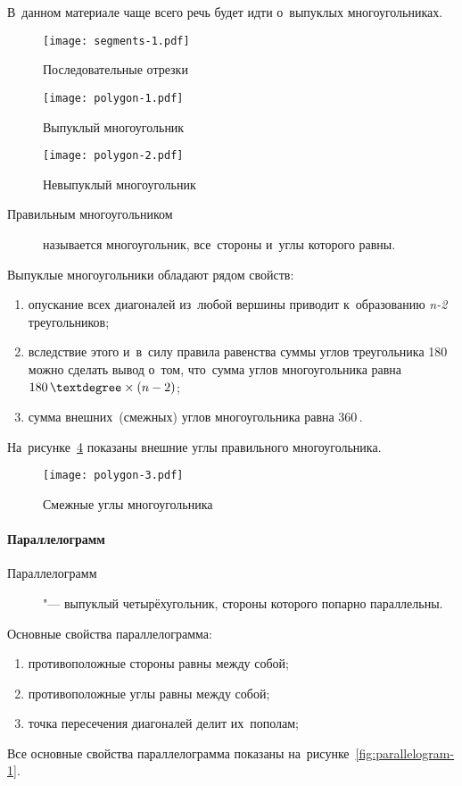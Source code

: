 \documentclass[]{scrartcl}
\begin{document}
В~данном материале чаще всего речь будет идти о~выпуклых многоугольниках.
 
\begin{figure}[ht]
\centering %
\texttt{[image: segments-1.pdf]}
\caption{Последовательные отрезки}\label{fig:segments-1}
\end{figure}

\begin{figure}[ht]
\centering %
\texttt{[image: polygon-1.pdf]}
\caption{Выпуклый многоугольник}\label{fig:polygon-1}
\end{figure}  

\begin{figure}[ht]
\centering %
\texttt{[image: polygon-2.pdf]}
\caption{Невыпуклый многоугольник}\label{fig:polygon-2}
\end{figure} 

\begin{description}
	\item[Правильным многоугольником] называется многоугольник, все~стороны и~углы которого равны.
\end{description} 

Выпуклые многоугольники обладают рядом свойств:
\begin{enumerate}
	\item опускание всех диагоналей из~любой вершины приводит к~образованию \textit{n-2} треугольников;
	\item вследствие этого и~в~силу правила равенства суммы углов треугольника 180\,\textdegree можно сделать вывод о~том, что~сумма углов многоугольника равна $180\,\textdegree \times (n-2)$;
	\item сумма внешних~(смежных) углов многоугольника равна 360\,\textdegree.
\end{enumerate}  
На~рисунке~\ref{fig:polygon-3} показаны внешние углы правильного многоугольника.
\begin{figure}[ht]
	\centering %
	\texttt{[image: polygon-3.pdf]}
	\caption{Смежные углы многоугольника}\label{fig:polygon-3}
\end{figure}

\paragraph{Параллелограмм}
\begin{description}
	\item[Параллелограмм] "--- выпуклый четырёхугольник, стороны которого попарно параллельны.
\end{description} 
Основные свойства параллелограмма:
\begin{enumerate}
	\item противоположные стороны равны между собой;
	\item противоположные углы равны между собой;
	\item точка пересечения диагоналей делит их~пополам;
	\end{enumerate}
Все основные свойства параллелограмма показаны на~рисунке~\ref{fig:parallelogram-1}.
\end{document}
